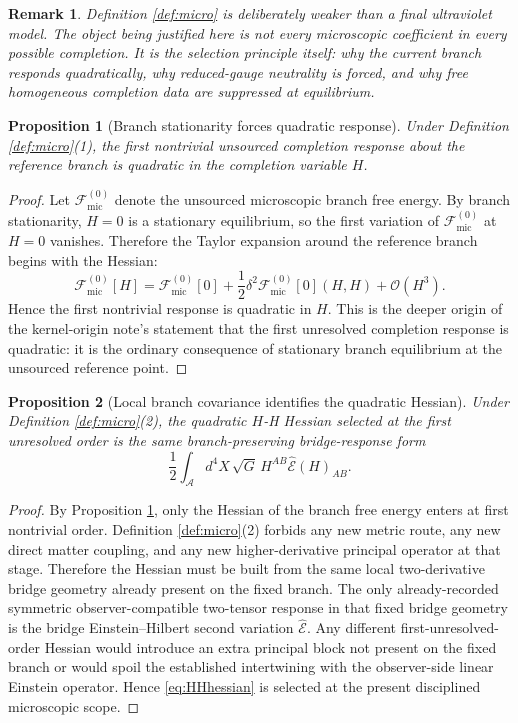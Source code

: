 \documentclass[11pt]{article}
\newcommand{\Sub}{\mathcal A}
\newcommand{\SubEinLin}{\widehat{\mathcal E}}
\newcommand{\MicFunctional}{\mathscr F_{\mathrm{mic}}}
\newtheorem{proposition}{Proposition}
\newtheorem{remark}{Remark}
\begin{document}
\begin{remark}
Definition \ref{def:micro} is deliberately weaker than a final ultraviolet model. The object being justified here is not every microscopic coefficient in every possible completion. It is the selection principle itself: why the current branch responds quadratically, why reduced-gauge neutrality is forced, and why free homogeneous completion data are suppressed at equilibrium.
\end{remark}

\begin{proposition}[Branch stationarity forces quadratic response]
\label{prop:quadratic}
Under Definition \ref{def:micro}(1), the first nontrivial unsourced completion response about the reference branch is quadratic in the completion variable \(H\).
\end{proposition}

\begin{proof}
Let \(\MicFunctional^{(0)}\) denote the unsourced microscopic branch free energy. By branch stationarity, \(H=0\) is a stationary equilibrium, so the first variation of \(\MicFunctional^{(0)}\) at \(H=0\) vanishes. Therefore the Taylor expansion around the reference branch begins with the Hessian:
\[
\MicFunctional^{(0)}[H]
=
\MicFunctional^{(0)}[0]
+\frac12 \delta^2\MicFunctional^{(0)}[0](H,H)
+\mathcal O(H^3).
\]
Hence the first nontrivial response is quadratic in \(H\). This is the deeper origin of the kernel-origin note's statement that the first unresolved completion response is quadratic: it is the ordinary consequence of stationary branch equilibrium at the unsourced reference point.
\end{proof}

\begin{proposition}[Local branch covariance identifies the quadratic Hessian]
\label{prop:hessian}
Under Definition \ref{def:micro}(2), the quadratic \(H\)-H Hessian selected at the first unresolved order is the same branch-preserving bridge-response form
\begin{equation}
\frac12
\int_{\Sub} d^4X\,\sqrt{G}\,
H^{AB}\SubEinLin(H)_{AB}.
\label{eq:HHhessian}
\end{equation}
\end{proposition}

\begin{proof}
By Proposition \ref{prop:quadratic}, only the Hessian of the branch free energy enters at first nontrivial order. Definition \ref{def:micro}(2) forbids any new metric route, any new direct matter coupling, and any new higher-derivative principal operator at that stage. Therefore the Hessian must be built from the same local two-derivative bridge geometry already present on the fixed branch. The only already-recorded symmetric observer-compatible two-tensor response in that fixed bridge geometry is the bridge Einstein--Hilbert second variation \(\SubEinLin\). Any different first-unresolved-order Hessian would introduce an extra principal block not present on the fixed branch or would spoil the established intertwining with the observer-side linear Einstein operator. Hence \eqref{eq:HHhessian} is selected at the present disciplined microscopic scope.
\end{proof}
\end{document}

